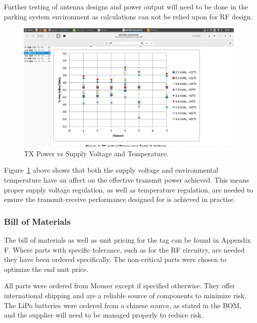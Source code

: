 Further testing of antenna designs and power output will need to be done in the parking system environment as calculations can not be relied upon for RF design.

\begin{figure}[H]
\begin{center}
\includegraphics[scale=0.35,trim={7cm 1.5cm 8cm 5.5cm},clip]{data/tx_power.png}
\caption{TX Power vs Supply Voltage and Temperature.\cite{DW-data}}
\label{fig:tx-power}
\end{center}
\end{figure}

Figure~\ref{fig:tx-power} above shows that both the supply voltage and environmental temperature have an affect on the effective transmit power achieved. This means proper supply voltage regulation, as well as temperature regulation, are needed to ensure the transmit-receive performance designed for is achieved in practise.

\newpage
\subsubsection{Bill of Materials}
The bill of materials as well as unit pricing for the tag can be found in Appendix F. Where parts with specific tolerance, such as for the RF circuitry, are needed they have been ordered specifically. The non-critical parts were chosen to optimize the end unit price. 

All parts were ordered from Mouser except if specified otherwise. They offer international shipping and are a reliable source of components to minimize risk. The LiPo batteries were ordered from a chinese source, as stated in the BOM, and the supplier will need to be managed properly to reduce risk.

